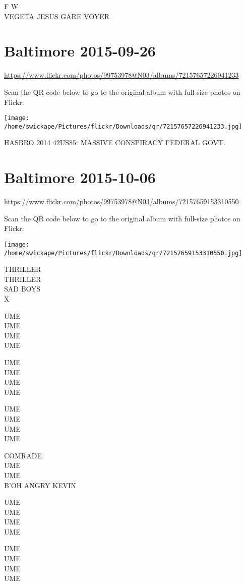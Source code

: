 \documentclass[10pt,letterpaper]{article}
\begin{document}
F W\\
VEGETA JESUS GARE VOYER


\section*{Baltimore 2015-09-26}

\url{https://www.flickr.com/photos/99753978@N03/albums/72157657226941233}

Scan the QR code below to go to the original album with full-size photos on Flickr:

\texttt{[image: /home/swickape/Pictures/flickr/Downloads/qr/72157657226941233.jpg]}


HASBRO 2014 42US85: MASSIVE CONSPIRACY FEDERAL GOVT.


\section*{Baltimore 2015-10-06}

\url{https://www.flickr.com/photos/99753978@N03/albums/72157659153310550}

Scan the QR code below to go to the original album with full-size photos on Flickr:

\texttt{[image: /home/swickape/Pictures/flickr/Downloads/qr/72157659153310550.jpg]}


THRILLER\\
THRILLER\\
SAD BOYS\\
X

UME\\
UME\\
UME\\
UME

UME\\
UME\\
UME\\
UME

UME\\
UME\\
UME\\
UME

COMRADE\\
UME\\
UME\\
B'OH ANGRY KEVIN

UME\\
UME\\
UME\\
UME

UME\\
UME\\
UME\\
UME
\end{document}
